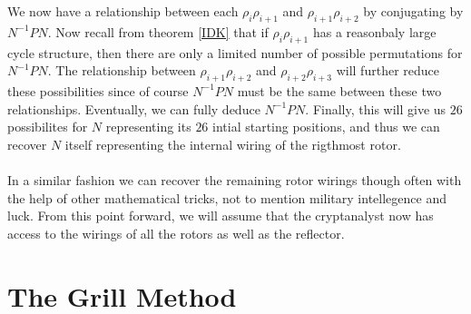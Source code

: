 We now have a relationship between each $\rho_i\rho_{i+1}$ and $\rho_{i+1}\rho_{i+2}$ by conjugating by $N^{-1}PN$. Now recall from theorem \ref{IDK} that if $\rho_i\rho_{i+1}$ has a reasonbaly large cycle structure, then there are only a limited number of possible permutations for $N^{-1}PN$. The relationship between $\rho_{i+1}\rho_{i+2}$ and $\rho_{i+2}\rho_{i+3}$ will further reduce these possibilities since of course $N^{-1}PN$ must be the same between these two relationships. Eventually, we can fully deduce $N^{-1}PN$. Finally, this will give us $26$ possibilites for $N$ representing its $26$ intial starting positions, and thus we can recover $N$ itself representing the internal wiring of the rigthmost rotor.
\\\\In a similar fashion we can recover the remaining rotor wirings though often with the help of other mathematical tricks, not to mention military intellegence and luck. From this point forward, we will assume that the cryptanalyst now has access to the wirings of all the rotors as well as the reflector.

\section{The Grill Method}

